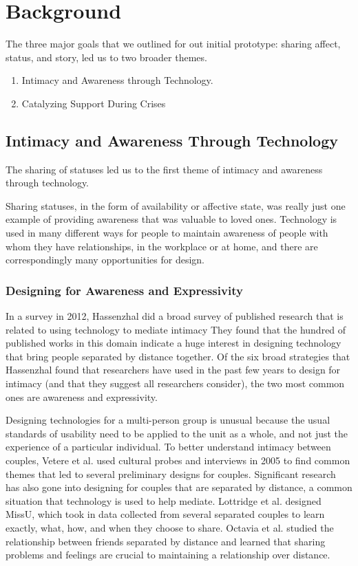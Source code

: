 \chapter{Background}
  The three major goals that we outlined for out initial prototype:
  sharing affect, status, and story, led us to two broader themes.
  \begin{enumerate}
  \item Intimacy and Awareness through Technology.
  \item Catalyzing Support During Crises
  \end{enumerate}

\section{Intimacy and Awareness Through Technology}
  The sharing of statuses led us to the first theme of
  intimacy and awareness through technology.

  Sharing statuses,
  in the form of availability or affective state,
  was really just one example of providing awareness that was valuable to loved ones.
  Technology is used in many different ways for people to maintain
  awareness of people with whom they have relationships,
  in the workplace or at home,
  and there are correspondingly many opportunities for design.

  \subsection{Designing for Awareness and Expressivity}
    In a survey in 2012, Hassenzhal did a broad survey of published research
    that is related to using technology to mediate intimacy
    \cite{hassenzhal12}
    They found that the hundred of published works in this domain indicate a
    huge interest in designing technology that bring people separated by distance together.
    Of the six broad strategies that Hassenzhal found
    that researchers have used in the past few years to design for intimacy
    (and that they suggest all researchers consider),
    the two most common ones are awareness and expressivity.

    Designing technologies for a multi-person group is unusual because the usual
    standards of usability need to be applied to the unit as a whole, and not just
    the experience of a particular individual. \cite{neustaedter12}
    To better understand intimacy between couples,
    Vetere et al. used cultural probes and interviews in 2005 to find
    common themes that led to several preliminary designs for couples.
    Significant research has also gone into designing for couples that are
    separated by distance,
    a common situation that technology is used to help mediate.
    \cite{vetere05}
    Lottridge et al. designed MissU, which took in data collected from several separated couples
    to learn exactly, what, how, and when they choose to share.
    \cite{lottridge09}
    Octavia et al. studied the relationship between friends separated by distance
    and learned that sharing problems and feelings are crucial to
    maintaining a relationship over distance.
    \cite{octavia07}

